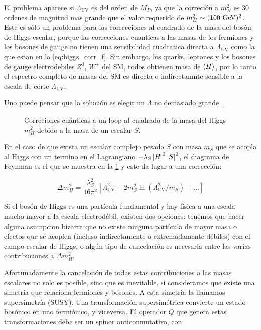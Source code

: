 El problema aparece si $\Lambda_\text{UV}$ es del orden de $M_P$, ya que la correci\'on a $m_H^2$ es
30 ordenes de magnitud mas grande que el valor requerido de $m_H^2 \sim (100 \gev)^2$.
Este es sólo un problema para las correcciones al cuadrado de la masa del bos\'on de Higgs escalar,
porque las correcciones cuanticas a las masas de los fermiones y los bosones de gauge no tienen una
sensibilidad cuadratica directa a $\Lambda_\text{UV}$ como la que estan en la \cref{eq:higgs_corr_f}.
Sin embargo, los quarks, leptones y los bosones de gauge electrodebiles $Z^0$, $W^{\pm}$ del SM,
todos obtienen masa de $\langle H \rangle$, por lo  tanto el espectro completo de masas del SM es directa
o indirectamnte sensible a la escala de corte $\Lambda_\text{UV}$.

Uno puede pensar que la soluci\'on es elegir un $\Lambda$ no demasiado grande .

\begin{figure}[h]
  \centering
  
  \caption{Correciones cu\'anticas a un loop al cuadrado de la masa del Higgs $m_H^2$ debido a la
    masa de un escalar $S$.}\label{fig:higgs_correction_s}
\end{figure}

En el caso de que exista un escalar complejo pesado $S$ con masa $m_S$ que se acopla al Higgs con un
termino en el Lagrangiano $-\lambda_S \left| H \right|^2 \left| S \right|^2$, el diagrama de Feynman es el que se muestra
en la \cref{fig:higgs_correction_s} y este da lugar a una corrección:

\begin{equation}
  \Delta m_H^2 = \frac{\lambda_S^2}{16\pi^2} \left[ \Lambda^2_\text{UV} - 2 m_S^2 \ln (\Lambda^2_\text{UV}/m_S) +  \ldots \right]
\end{equation}

Si el bosón de Higgs es una partícula fundamental y hay física a una escala mucho mayor a la
escala electrodébil, existen dos opciones: tenemos que hacer alguna asumpcion bizarra que no existe ninguna
partícula de mayor masa o efectos que se acoplen (incluso indirectamente o extremadamente débiles) con el
campo escalar de Higgs, o algún tipo de  cancelación es necesaria entre las varias contribuciones a $\Delta m_H^2$.

Afortunadamente la cancelación de todas estas contribuciones a las masas escalares
no solo es posible, sino que es inevitable, si consideramos que existe una simetría
que relaciona fermiones y bosones.
A esta simetria la llamamos supersimetría (SUSY).
Una transformación supersimétrica convierte un estado bosónico en uno fermiónico,
y viceversa. El operador $Q$ que genera estas transformaciones debe ser un spinor
anticonmutativo, con

